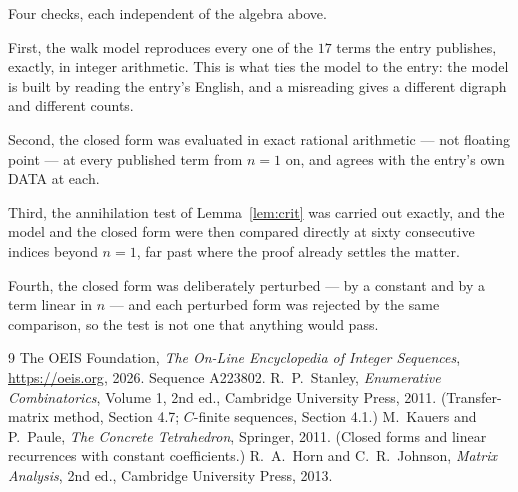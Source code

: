 \documentclass[11pt,a4paper]{article}
\theoremstyle{plain}
\theoremstyle{definition}
\begin{document}
Four checks, each independent of the algebra above.

First, the walk model reproduces every one of the $17$ terms the entry publishes,
exactly, in integer arithmetic. This is what ties the model to the entry: the model is built
by reading the entry's English, and a misreading gives a different digraph and different
counts.

Second, the closed form was evaluated in exact rational arithmetic --- not floating point ---
at every published term from $n=1$ on, and agrees with the entry's own DATA at each.

Third, the annihilation test of Lemma~\ref{lem:crit} was carried out exactly, and the model
and the closed form were then compared directly at sixty consecutive indices beyond
$n=1$, far past where the proof already settles the matter.

Fourth, the closed form was deliberately perturbed --- by a constant and by a term linear in
$n$ --- and each perturbed form was rejected by the same comparison, so the test is not one
that anything would pass.

\begin{thebibliography}{9}
 The OEIS Foundation, \emph{The On-Line Encyclopedia of Integer
Sequences}, \url{https://oeis.org}, 2026. Sequence A223802.
 R.~P.~Stanley, \emph{Enumerative Combinatorics}, Volume 1, 2nd ed.,
Cambridge University Press, 2011. (Transfer-matrix method, Section 4.7; $C$-finite sequences,
Section 4.1.)
 M.~Kauers and P.~Paule, \emph{The Concrete Tetrahedron}, Springer, 2011.
(Closed forms and linear recurrences with constant coefficients.)
 R.~A.~Horn and C.~R.~Johnson, \emph{Matrix Analysis}, 2nd ed., Cambridge
University Press, 2013.
\end{thebibliography}
\end{document}
